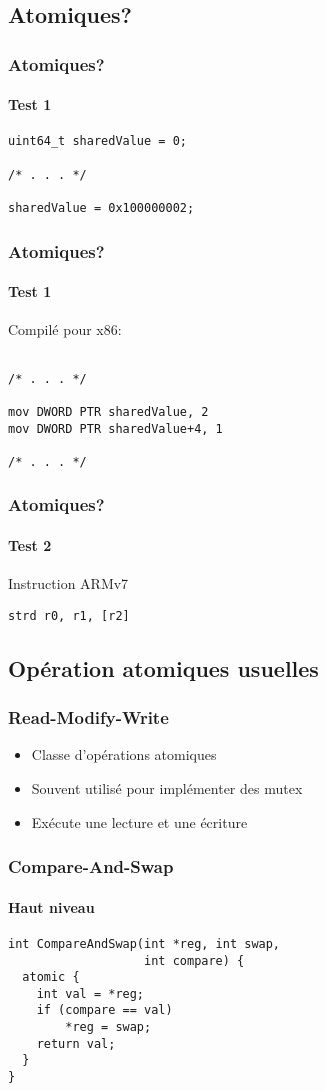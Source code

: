\documentclass{beamer}
\begin{document}
\subsection{Atomiques?}
\begin{frame}[fragile]
\frametitle{Atomiques?}
\framesubtitle{Test 1}
\begin{lstlisting}
uint64_t sharedValue = 0;

/* . . . */

sharedValue = 0x100000002;
\end{lstlisting}
\end{frame}

\begin{frame}[fragile]
\frametitle{Atomiques?}
\framesubtitle{Test 1}
Compilé pour x86:
\begin{lstlisting}

/* . . . */

mov	DWORD PTR sharedValue, 2
mov	DWORD PTR sharedValue+4, 1

/* . . . */
\end{lstlisting}
\end{frame}

\begin{frame}[fragile]
\frametitle{Atomiques?}
\framesubtitle{Test 2}
Instruction ARMv7

\begin{lstlisting}
strd r0, r1, [r2]
\end{lstlisting}

\end{frame}

\subsection{Opération atomiques usuelles}
\begin{frame}
\frametitle{Read-Modify-Write}
\begin{itemize}
\item Classe d'opérations atomiques
\item Souvent utilisé pour implémenter des mutex
\item Exécute une lecture et une écriture
\end{itemize}
\end{frame}

\begin{frame}[fragile]
\frametitle{Compare-And-Swap}
\framesubtitle{Haut niveau}
\begin{lstlisting}
int CompareAndSwap(int *reg, int swap,
                   int compare) {
  atomic {                   
    int val = *reg;
    if (compare == val)
        *reg = swap;
    return val;
  }
}
\end{lstlisting}
\end{frame}
\end{document}

